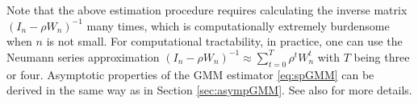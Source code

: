 \documentclass[11pt, A4paper, openany, uplatex]{book}
\begin{document}
Note that the above estimation procedure requires calculating the inverse matrix $(I_n - \rho W_n)^{-1}$ many times, which is computationally extremely burdensome when $n$ is not small.
For computational tractability, in practice, one can use the Neumann series approximation $(I_n - \rho W_n)^{-1} \approx \sum_{t = 0}^T \rho^t W_n^t$ with $T$ being three or four.
Asymptotic properties of the GMM estimator \eqref{eq:spGMM} can be derived in the same way as in Section \ref{sec:asympGMM}.
See also \cite{pinkse1998contracting} for more details.
\end{document}
